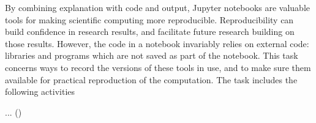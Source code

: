 \begin{task}[title=Archiving software for reproducible workflows,
  id=reproducibility,
  lead=XXX,
  PM=1,
  wphases={0-48},
  partners={SRL,XFEL}
]
  By combining explanation with code and output, Jupyter notebooks are
  valuable tools for making scientific computing more reproducible.
  Reproducibility can build confidence in research results, and facilitate
  future research building on those results.
  However, the code in a notebook invariably relies on external code: libraries
  and programs which are not saved as part of the notebook.
  This task concerns ways to record the versions of these tools in use, and to
  make sure them available for practical reproduction of the computation.
  The task includes the following activities
  \begin{compactitem}
  \item ...
    ()
  \end{compactitem}
\end{task}
